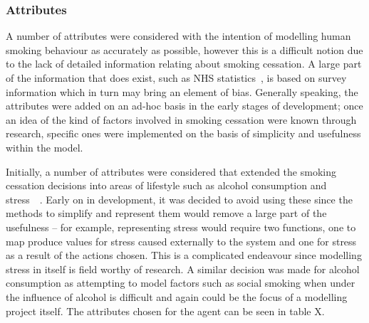 \documentclass[]{report}
\begin{document}
\subsubsection{Attributes}
A number of attributes were considered with the intention of modelling human smoking behaviour as accurately as possible, however this is a difficult notion due to the lack of detailed information relating about smoking cessation. A large part of the information that does exist, such as NHS statistics~\cite{NHS-43}, is based on survey information which in turn may bring an element of bias. Generally speaking, the attributes were added on an ad-hoc basis in the early stages of development; once an idea of the kind of factors involved in smoking cessation were known through research, specific ones were implemented on the basis of simplicity and usefulness within the model.

Initially, a number of attributes were considered that extended the smoking cessation decisions into areas of lifestyle such as alcohol consumption and stress~\cite{malay}~\cite{NHS-44}. Early on in development, it was decided to avoid using these since the methods to simplify and represent them would remove a large part of the usefulness – for example, representing stress would require two functions, one to map produce values for stress caused externally to the system and one for stress as a result of the actions chosen. This is a complicated endeavour since modelling stress in itself is field worthy of research. A similar decision was made for alcohol consumption as attempting to model factors such as social smoking when under the influence of alcohol is difficult and again could be the focus of a modelling project itself.
The attributes chosen for the agent can be seen in table X.
\end{document}
